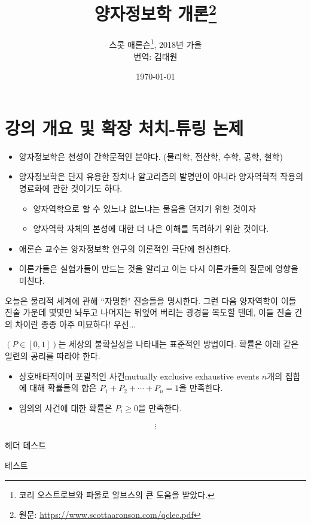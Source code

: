 \documentclass[a4paper,chapter,kosection,atbegshi,hidelinks,itemph]{oblivoir}
\begin{document}
\title{양자정보학 개론\thanks{원문: \url{https://www.scottaaronson.com/qclec.pdf}}}
\author{
    스콧 애론슨\thanks{코리 오스트로브와 파울로 알브스의 큰 도움을 받았다.}, 
    2018년 가을\\
    번역: 김태원
}
\date{\today}
\newpage
\maketitle\thispagestyle{empty}\newpage

\tableofcontents\pagestyle{plain}

\chapter{강의 개요 및 확장 처치-튜링 논제}
\begin{itemize}[label=\(\blacktriangleright\)]
    \item 양자정보학은 천성이 간학문적인 분야다. (물리학, 전산학, 수학, 공학, 철학)
    \item 양자정보학은 단지 유용한 장치나 알고리즘의 발명만이 아니라 양자역학적 작용의 명료화에 관한 것이기도 하다.
    \begin{itemize}
        \item 양자역학으로 할 수 있느냐 없느냐는 물음을 던지기 위한 것이자
        \item 양자역학 자체의 본성에 대한 더 나은 이해를 독려하기 위한 것이다.
    \end{itemize}
    \item 애론슨 교수는 양자정보학 연구의 이론적인 극단에 헌신한다.
    \item 이론가들은 실험가들이 만드는 것을 알리고 이는 다시 이론가들의 질문에 영향을 미친다.
\end{itemize}\hfill\break
오늘은 물리적 세계에 관해 ``자명한" 진술들을 명시한다.
그런 다음 양자역학이 이들 진술 가운데 몇몇만 놔두고 나머지는 뒤엎어 버리는 광경을
목도할 텐데, 이들 진술 간의 차이란 종종 아주 미묘하다!
우선...\hfill\break

\begin{description}[leftmargin=0cm]
    \item[\textbf{확률}\;] 
        $(P\in[0,1])$는 세상의 불확실성을 나타내는 표준적인 방법이다. 
        확률은 아래 같은 일련의 공리를 따라야 한다.
        \begin{itemize}[label=$\blacktriangleright$]
            \item  상호배타적이며 포괄적인 사건{\footnotesize mutually exclusive
            exhaustive events} $n$개의 집합에 대해  
                확률들의 합은 $P_1+P_2+\cdots+P_n=1$을 만족한다.
            \item 임의의 사건에 대한 확률은 $P_i\geq0$을 만족한다.
        \end{itemize}
        \begin{align*}\pmb{\vdots}\end{align*}
\end{description}

\newpage\pagestyle{hf}
헤더 테스트

\newpage
{} 테스트
\end{document}
